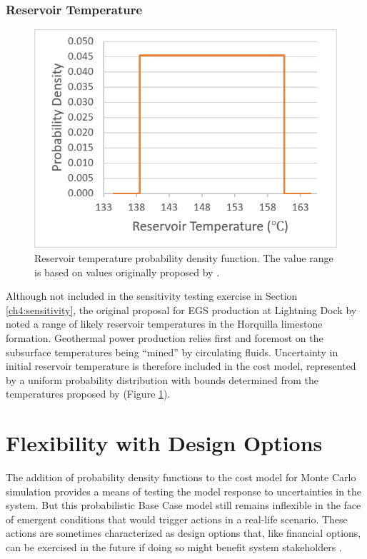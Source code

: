 \subsubsection{Reservoir Temperature}\label{cm4:prob_temp}
\begin{figure} %
\centering
\includegraphics[scale=0.45]{templates/images/Figure-Reservoir_Temp_PDF.png}
\singlespacing
\caption[Reservoir temperature PDF]{Reservoir temperature probability density function. The value range is based on values originally proposed by \protect\citet{schochet_development_2001}.}
\label{fig:cm_temp_pdf}
\end{figure}
Although not included in the sensitivity testing exercise in Section \ref{ch4:sensitivity}, the original proposal for EGS production at Lightning Dock by \citet{schochet_development_2001} noted a range of likely reservoir temperatures in the Horquilla limestone formation. Geothermal power production relies first and foremost on the subsurface temperatures being ``mined'' by circulating fluids. Uncertainty in initial reservoir temperature is therefore included in the cost model, represented by a uniform probability distribution with bounds determined from the temperatures proposed by \citet{schochet_development_2001} (Figure \ref{fig:cm_temp_pdf}).
\vfill 
\section{Flexibility with Design Options}\label{ch4:flex_design_options}
The addition of probability density functions to the cost model for Monte Carlo simulation provides a means of testing the model response to uncertainties in the system. But this probabilistic Base Case model still remains inflexible in the face of emergent conditions that would trigger actions in a real-life scenario. These actions are sometimes characterized as design options that, like financial options, can be exercised in the future if doing so might benefit system stakeholders \citep[p.\ 270-272]{de_neufville_flexibility_2011}.

